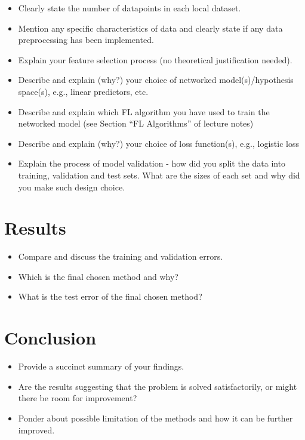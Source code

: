 \documentclass{article}
\begin{document}
\begin{itemize} 
\item Clearly state the number of datapoints in each local dataset. 
\item Mention any specific characteristics of data and clearly state if any data preprocessing has been implemented.
\item Explain your feature selection process (no theoretical justification needed).
\item Describe and explain (why?) your choice of networked model(s)/hypothesis
space(s), e.g., linear predictors, etc.
\item Describe and explain which FL algorithm you have used to train the networked model (see Section ``FL Algorithms'' of lecture notes)
\item Describe and explain (why?) your choice of loss function(s), e.g., logistic loss
\item Explain the process of model validation - how did you split the data into training, validation and test sets. What are the sizes of each set and why did
you make such design choice.
\end{itemize} 

\section{Results} 
\label{sec_results} 

\begin{itemize} 
	\item Compare and discuss the training and validation errors. 
	\item Which is the final chosen method and why?
	\item What is the test error of the final chosen method?
\end{itemize} 

\section{Conclusion}

\begin{itemize} 
\item Provide a succinct summary of your findings.
\item Are the results suggesting that the problem is solved satisfactorily, or might
there be room for improvement?
\item Ponder about possible limitation of the methods and how it can be further improved.
\end{itemize} 







\end{document}
